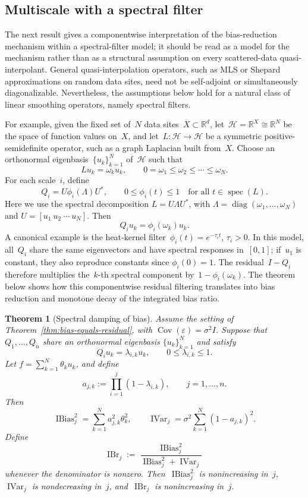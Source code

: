 \documentclass[12pt]{article}
\newtheorem{theorem}{Theorem}[section]
\newcommand{\R}{\mathbb{R}}
\DeclareMathOperator{\ibr}{IBr}
\newcommand{\ibias}{\operatorname{IBias}^2}
\DeclareMathOperator{\ivar}{IVar}
\begin{document}
\subsection{Multiscale with a spectral filter}\label{sec:spectral}

The next result gives a componentwise interpretation of the bias-reduction mechanism within a spectral-filter model; it should be read as a model for the mechanism rather than as a structural assumption on every scattered-data quasi-interpolant. General quasi-interpolation operators, such as MLS or Shepard approximations on random data sites, need not be self-adjoint or simultaneously diagonalizable. Nevertheless, the assumptions below hold for a natural class of linear smoothing operators, namely spectral filters.

For example, given the fixed set of~$N$ data sites~$X\subset \R^d$, let~$\mathcal H=\R^{X}\cong\R^{N}$ be the space of function values on~$X$, and let~$L:\mathcal H\to\mathcal H$ be a symmetric positive-semidefinite operator, such as a graph Laplacian built from~$X$. Choose an orthonormal eigenbasis~$\{u_k\}_{k=1}^N$ of~$\mathcal H$ such that
\[
    L u_k=\omega_k u_k,
    \qquad
    0=\omega_1\leq \omega_2\leq\cdots\leq \omega_N .
\]
For each scale~$i$, define
\begin{equation}\label{eq:spectral-filter}
     Q_i= U \phi_i(\Lambda) U^{*},
    \qquad
    0\leq \phi_i(t) \leq 1 \quad\text{for all } t\in\operatorname{spec}(L).
\end{equation}
Here we use the spectral decomposition $L = U \Lambda U^{*}$, with $\Lambda=\operatorname{diag}(\omega_1,\ldots,\omega_N)$ and $U = [u_1\ u_2\ \cdots\ u_N]$. Then
\[
    Q_i u_k=\phi_i(\omega_k)u_k .
\]
A canonical example is the heat-kernel filter~$\phi_i(t)=e^{-\tau_i t}$, $\tau_i>0$. In this model, all~$Q_i$ share the same eigenvectors and have spectral responses in~$[0,1]$; if~$u_1$ is constant, they also reproduce constants since $\phi_i(0)=1$. The residual~$I-Q_i$ therefore multiplies the~$k$-th spectral component by~$1-\phi_i(\omega_k)$. The theorem below shows how this componentwise residual filtering translates into bias reduction and monotone decay of the integrated bias ratio.

\begin{theorem}[Spectral damping of bias]
\label{thm:spectral-damping}
Assume the setting of Theorem~\ref{thm:bias-equals-residual}, with \(\operatorname{Cov}(\varepsilon)=\sigma^2 I\). Suppose that \(Q_1,\ldots,Q_n\) share an orthonormal eigenbasis \(\{u_k\}_{k=1}^N\) and satisfy
\[
    Q_i u_k=\lambda_{i,k}u_k,
    \qquad
    0\leq \lambda_{i,k}\leq 1 .
\]
Let \(f=\sum_{k=1}^N\theta_k u_k\), and define
\[
    a_{j,k}:=\prod_{i=1}^j(1-\lambda_{i,k}),
    \qquad j=1,\ldots,n .
\]
Then
\[
    \ibias_j
    =
    \sum_{k=1}^N a_{j,k}^2\theta_k^2,
    \qquad
    \ivar_j
    =
    \sigma^2\sum_{k=1}^N(1-a_{j,k})^2 .
\]
Define
\[
    \ibr_j:=\frac{\ibias_j}{\ibias_j+\ivar_j}
\]
whenever the denominator is nonzero. Then~\(\ibias_j\) is nonincreasing in~\(j\), \(\ivar_j\) is nondecreasing in~\(j\), and~\(\ibr_j\) is nonincreasing in~\(j\).
\end{theorem}
\end{document}
